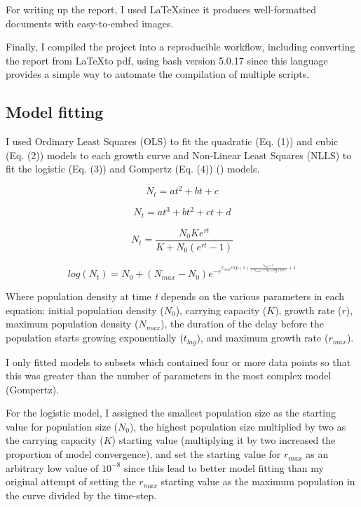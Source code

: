 \documentclass[11pt]{article}
\begin{document}
	For writing up the report, I used \LaTeX since it produces well-formatted documents with easy-to-embed images.
	
	Finally, I compiled the project into a reproducible workflow, including converting the report from \LaTeX to pdf, using bash version 5.0.17 \cite{gnu2007free} since this language provides a simple way to automate the compilation of multiple scripts.
	
	
	\subsection{Model fitting}
	
	I used Ordinary Least Squares (OLS) to fit the quadratic (Eq. (1)) and cubic (Eq. (2)) models to each growth curve and Non-Linear Least Squares (NLLS) to fit the logistic (Eq. (3)) and Gompertz (Eq. (4)) (\cite{gompertz1825xxiv}) models.
	
	\begin{equation}
		N_t = at^2 + bt + c
	\end{equation}
	
	\begin{equation}
		N_t = at^3 + bt^2 + ct + d
	\end{equation}
	
	\begin{equation}
		N_t = \frac{N_0Ke^{rt}}{K + N_0(e^{rt} - 1)}
	\end{equation}
	
	\begin{equation}
		log(N_t) = N_0 + (N_{max} - N_0)e^{-e^{r_{max}exp(1)\frac{t_{lag}-t}{(N_{max}-N_0)log(10)}+1}}
	\end{equation}
	
	Where population density at time \emph{t} depends on the various parameters in each equation: initial population density ($N_0$), carrying capacity ($K$), growth rate ($r$), maximum population density ($N_{max}$), the duration of the delay before the population starts growing exponentially ($t_{lag}$), and maximum growth rate ($r_{max}$).
	
	I only fitted models to subsets which contained four or more data points so that this was greater than the number of parameters in the most complex model (Gompertz). 
	
	For the logistic model, I assigned the smallest population size as the starting value for population size ($N_0$), the highest population size multiplied by two as the carrying capacity ($K$) starting value (multiplying it by two increased the proportion of model convergence), and set the starting value for $r_{max}$ as an arbitrary low value of $10^{-8}$ since this lead to better model fitting than my original attempt of setting the $r_{max}$ starting value as the maximum population in the curve divided by the time-step.
	
\end{document}
